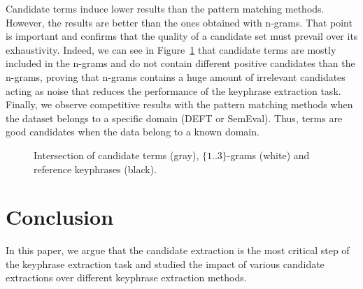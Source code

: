       Candidate terms induce lower results than the pattern matching methods.
      However, the results are better than the ones obtained with n-grams. That
      point is important and confirms that the quality of a candidate set must
      prevail over its exhaustivity. Indeed, we can see in
      Figure~\ref{fig:quality_prevails_over_exhaustivity} that candidate terms
      are mostly included in the n-grams and do not contain different positive
      candidates than the n-grams, proving that n-grams contains a huge amount
      of irrelevant candidates acting as noise that reduces the performance of
      the keyphrase extraction task. Finally, we observe competitive results
      with the pattern matching methods when the dataset belongs to a specific
      domain (DEFT or SemEval). Thus, terms are good candidates when the data
      belong to a known domain.
      \begin{figure}
        \centering
        \vspace{1em}
        \caption{Intersection of candidate terms (gray), $\{1..3\}$-grams
                 (white) and reference keyphrases (black).
                 \label{fig:quality_prevails_over_exhaustivity}}
      \end{figure}

\section{Conclusion}
\label{sec:conclusion}
  In this paper, we argue that the candidate extraction is the most critical
  step of the keyphrase extraction task and studied the impact of various
  candidate extractions over different keyphrase extraction methods.

